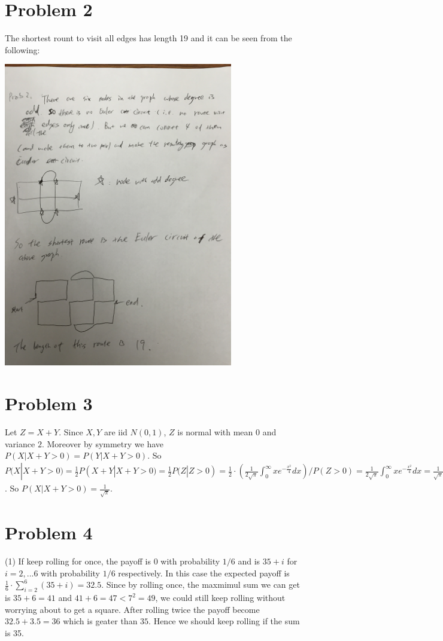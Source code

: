 \documentclass[12pt]{amsart}
\begin{document}
\section{Problem 2}
The shortest rount to visit all edges has length 19 and it can be seen from the following:

\begin{framed}
\includegraphics[width=10cm]{quiz2Pro2.jpg}
\end{framed}

\section{Problem 3}
Let $Z=X+Y$. Since $X,Y$ are iid $N(0,1)$, $Z$ is normal with mean $0$ and variance $2$. Moreover by symmetry we have $P(X|X+Y>0)=P(Y|X+Y>0)$. So $P(X|X+Y>0)=\frac{1}{2}P(X+Y|X+Y>0)=\frac{1}{2}P(Z|Z>0)=\frac{1}{2}\cdot(\frac{1}{2\sqrt{\pi}}\int_{0}^{\infty}xe^{-\frac{x^2}{4}}dx)/P(Z>0)=\frac{1}{2\sqrt{\pi}}\int_{0}^{\infty}xe^{-\frac{x^2}{4}}dx=\frac{1}{\sqrt{\pi}}\int_{0}^{\infty}e^{-\frac{x^2}{4}}d(\frac{x^2}{4})=-\frac{1}{\sqrt{\pi}}e^{-y}|_0^{\infty}=\frac{1}{\sqrt{\pi}}$. So $P(X|X+Y>0)=\frac{1}{\sqrt{\pi}}$.

\section{Problem 4}
(1) If keep rolling for once, the payoff is $0$ with probability $1/6$ and is $35+i$ for $i=2,...6$ with probability $1/6$ respectively. In this case the expected payoff is $\frac{1}{6}\cdot\sum_{i=2}^6(35+i)=32.5$. Since by rolling once, the maxmimul sum we can get is $35+6=41$ and $41+6=47<7^2=49$, we could still keep rolling without worrying about to get a square. After rolling twice the payoff become $32.5+3.5=36$ which is geater than $35$. Hence we should keep rolling if the sum is 35. 
\end{document}
